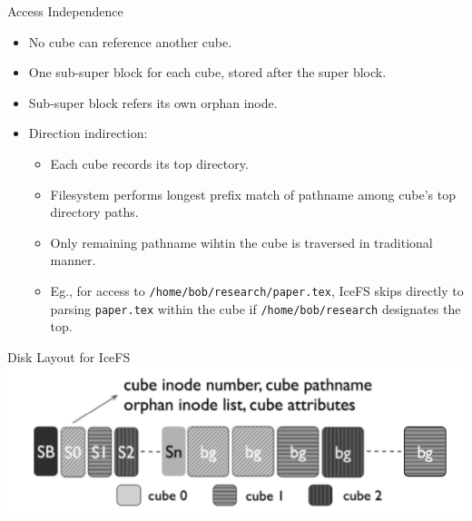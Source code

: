 \documentclass[aspectratio=169]{beamer}
\newcommand{\bi}{\begin{itemize}}
\newcommand{\ei}{\end{itemize}}
\begin{document}
\begin{frame}{Access Independence}
            \bi
        \item No cube can reference another cube.
        \item One sub-super block for each cube, stored after the super block.
        \item Sub-super block refers its own orphan inode.
        \item Direction indirection:
            \bi
        \item Each cube records its top directory.
        \item Filesystem performs longest prefix match of pathname among cube's top
            directory paths.
        \item Only remaining pathname wihtin the cube is traversed in traditional
            manner.
        \item Eg., for access to \texttt{/home/bob/research/paper.tex}, IceFS skips
            directly to parsing \texttt{paper.tex} within the cube if
            \texttt{/home/bob/research} designates the top.
            \ei
            \ei
\end{frame}

\begin{frame}{Disk Layout for IceFS}
    \includegraphics[scale=0.3]{./figures/fig5.png}
\end{frame}
\end{document}
